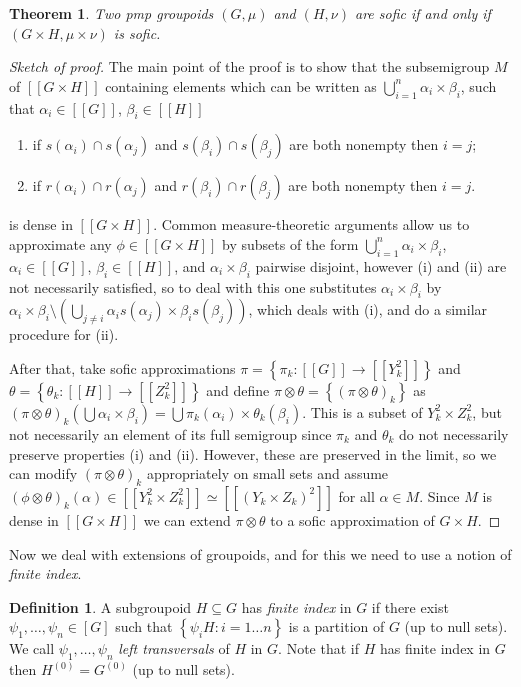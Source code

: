 \documentclass[11pt]{amsart}
\theoremstyle{plain}    \newtheorem{theorem}[generalnumbering]{Theorem}
\theoremstyle{plain}    \newtheorem{corollary}[generalnumbering]{Corollary}
\theoremstyle{definition}   \newtheorem{definition}[generalnumbering]{Definition}
\theoremstyle{definition}   \newtheorem{example}[generalnumbering]{Example}
\theoremstyle{plain}    \newtheorem{proposition}[generalnumbering]{Proposition}
\theoremstyle{plain}    \newtheorem{lemma}[generalnumbering]{Lemma}
\theoremstyle{plain}    \newtheorem{plainstyle}[generalnumbering]{\namefordifferentenvironment}
\theoremstyle{plain}    \newtheorem*{plainstyle*}{\namefordifferentenvironment}
\theoremstyle{definition}    \newtheorem{definitionstyle}[generalnumbering]{\namefordifferentenvironment}
\theoremstyle{definition}    \newtheorem*{definitionstyle*}{\namefordifferentenvironment}
\begin{document}
\begin{theorem}\label{theoremproducts}
Two pmp groupoids $(G,\mu)$ and $(H,\nu)$ are sofic if and only if $(G\times H,\mu\times\nu)$ is sofic.
\end{theorem}
\begin{proof}[Sketch of proof]
The main point of the proof is to show that the subsemigroup $M$ of $[[G\times H]]$ containing elements which can be written as $\bigcup_{i=1}^n\alpha_i\times\beta_i$, such that $\alpha_i\in[[G]]$, $\beta_i\in[[H]]$
\begin{enumerate}[label=(\roman*)]
\item if $s(\alpha_i)\cap s(\alpha_j)$ and $s(\beta_i)\cap s(\beta_j)$ are both nonempty then $i=j$;
\item if $r(\alpha_i)\cap r(\alpha_j)$ and $r(\beta_i)\cap r(\beta_j)$ are both nonempty then $i=j$.
\end{enumerate}
is dense in $[[G\times H]]$. Common measure-theoretic arguments allow us to approximate any $\phi\in[[G\times H]]$ by subsets of the form $\bigcup_{i=1}^n\alpha_i\times\beta_i$, $\alpha_i\in[[G]]$, $\beta_i\in[[H]]$, and $\alpha_i\times\beta_i$ pairwise disjoint, however (i) and (ii) are not necessarily satisfied, so to deal with this one substitutes $\alpha_i\times\beta_i$ by $\alpha_i\times\beta_i\setminus\left(\bigcup_{j\neq i}\alpha_is(\alpha_j)\times\beta_is(\beta_j)\right)$, which deals with (i), and do a similar procedure for (ii).

After that, take sofic approximations $\pi=\left\{\pi_k:[[G]]\to[[Y_k^2]]\right\}$ and $\theta=\left\{\theta_k:[[H]]\to[[Z_k^2]]\right\}$ and define $\pi\otimes\theta=\left\{(\pi\otimes\theta)_k\right\}$ as $(\pi\otimes\theta)_k(\bigcup\alpha_i\times\beta_i)=\bigcup\pi_k(\alpha_i)\times\theta_k(\beta_i)$. This is a subset of $Y_k^2\times Z_k^2$, but not necessarily an element of its full semigroup since $\pi_k$ and $\theta_k$ do not necessarily preserve properties (i) and (ii). However, these are preserved in the limit, so we can modify $(\pi\otimes\theta)_k$ appropriately on small sets and assume $(\phi\otimes\theta)_k(\alpha)\in[[Y_k^2\times Z_k^2]]\simeq[[(Y_k\times Z_k)^2]]$ for all $\alpha\in M$. Since $M$ is dense in $[[G\times H]]$ we can extend $\pi\otimes\theta$ to a sofic approximation of $G\times H$.\qedhere
\end{proof}

Now we deal with extensions of groupoids, and for this we need to use a notion of \emph{finite index}.
\begin{definition}
A subgroupoid $H\subseteq G$ has \emph{finite index} in $G$ if there exist $\psi_1,\ldots,\psi_n\in[G]$ such that $\left\{\psi_iH:i=1\ldots n\right\}$ is a partition of $G$ (up to null sets). We call $\psi_1,\ldots,\psi_n$ \emph{left transversals} of $H$ in $G$. Note that if $H$ has finite index in $G$ then $H^{(0)}=G^{(0)}$ (up to null sets).
\end{definition}
\end{document}
